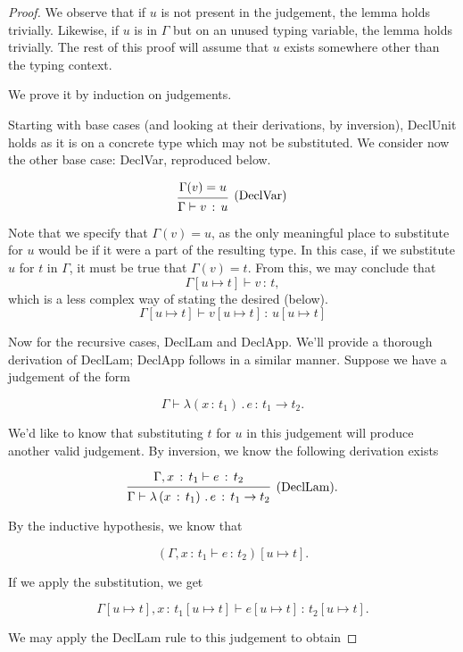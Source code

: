 \documentclass{article}
\newcommand{\G}{\Gamma}
\newcommand{\tp}{t}
\newcommand{\uv}{u}
\newcommand{\e}{e}
\newcommand{\x}{x}
\newcommand{\var}{v}
\newcommand{\withtp}[2]{{#1} \,:\, {#2}}
\newcommand{\lamtp}[3]{\lambda \left( {\withtp {#1} {#2}} \right) \,.\, {#3}}
\newcommand{\arr}[2]{{#1} \to {#2}}
\newcommand{\hastp}[3]{#1 \vdash {\withtp {#2} {#3}}}
\newcommand{\deduct}[3][]
{
  \begin{prooftree}
    \hypo{#2}
    \infer1[\text{#1}]{#3}
  \end{prooftree}
}
\begin{document}
\begin{proof}
  We observe that if \(\uv\) is not present in the judgement, the lemma holds
  trivially. Likewise, if \(\uv\) is in \(\G\) but on an unused typing variable,
  the lemma holds trivially. The rest of this proof will assume that \(\uv\)
  exists somewhere other than the typing context.

  We prove it by induction on judgements.

  Starting with base cases (and looking at their derivations, by inversion),
  DeclUnit holds as it is on a concrete type which may not be substituted. We
  consider now the other base case: DeclVar, reproduced below.

  \[
    \deduct
    {\G(\var) = \uv}
    {\hastp \G \var \uv}
    {\text{(DeclVar)}}
  \]

  Note that we specify that \(\G(\var) = \uv\), as the only meaningful place to
  substitute for \(\uv\) would be if it were a part of the resulting type. In
  this case, if we substitute \(\uv\) for \(\tp\) in \(\G\), it must be true
  that \(\G(\var) = \tp\). From this, we may conclude that
  \[ \hastp {\G[\uv \mapsto \tp]} {\var} {\tp}, \]
  which is a less complex way of stating the desired (below).
  \[ \hastp {\G[\uv \mapsto \tp]} {\var[\uv \mapsto \tp]} {\uv[\uv \mapsto \tp]} \]

  Now for the recursive cases, DeclLam and DeclApp. We'll provide a thorough
  derivation of DeclLam; DeclApp follows in a similar manner.  Suppose we have a
  judgement of the form

  \[\hastp \G {\lamtp {\x} {\tp_1} {\e}} {\arr {\tp_1} {\tp_2}}.\]

  We'd like to know that substituting \(\tp\) for \(\uv\) in this judgement will
  produce another valid judgement. By inversion, we know the following
  derivation exists

  \[
  \deduct
  {\hastp {\G, {\withtp \x {\tp_1}}} \e {\tp_2}}
  {\hastp \G {\lamtp {\x} {\tp_1} {\e}} {\arr {\tp_1} {\tp_2}}}
  {\text{(DeclLam)}}.
  \]

  By the inductive hypothesis, we know that

  \[ \left(\hastp {\G, {\withtp \x {\tp_1}}} \e {\tp_2}\right)[\uv \mapsto \tp]. \]

  If we apply the substitution, we get

  \[ \hastp {\G[\uv \mapsto \tp], {\withtp \x {\tp_1[\uv \mapsto \tp]}}} {\e[\uv
  \mapsto \tp]}{\tp_2[\uv \mapsto \tp]}.\]

  We may apply the DeclLam rule to this judgement to obtain


\end{proof}
\end{document}
